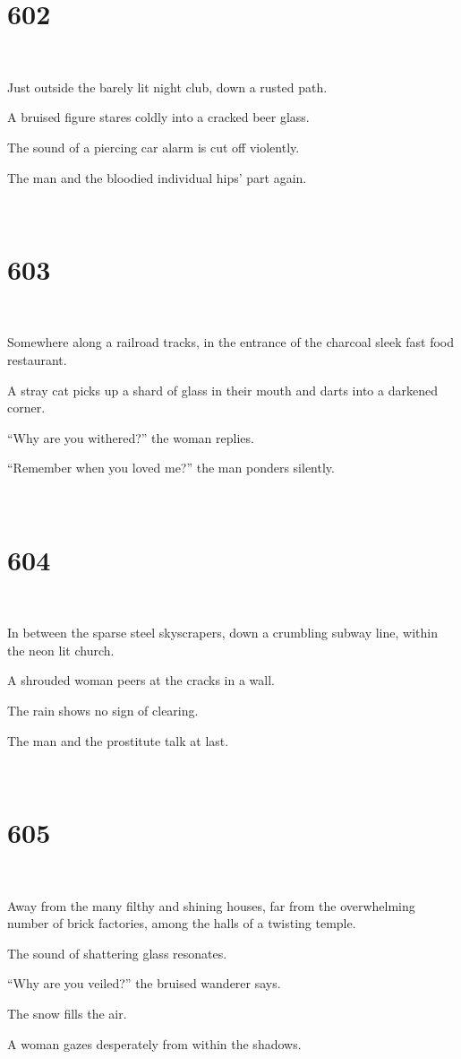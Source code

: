 \documentclass{report}
\begin{document}
\chapter*{602}
~

Just outside the barely lit night club, down a rusted path.

A bruised figure stares coldly into a cracked beer glass.

The sound of a piercing car alarm is cut off violently.

The man and the bloodied individual hips' part again.

~
\chapter*{603}
~

Somewhere along a railroad tracks, in the entrance of the charcoal sleek fast food restaurant.

A stray cat picks up a shard of glass in their mouth and darts into a darkened corner.

``Why are you withered?'' the woman replies.

``Remember when you loved me?'' the man ponders silently.

~
\chapter*{604}
~

In between the sparse steel skyscrapers, down a crumbling subway line, within the neon lit church.

A shrouded woman peers at the cracks in a wall.

The rain shows no sign of clearing.

The man and the prostitute talk at last.

~
\chapter*{605}
~

Away from the many filthy and shining houses, far from the overwhelming number of brick factories, among the halls of a twisting temple.

The sound of shattering glass resonates.

``Why are you veiled?'' the bruised wanderer says.

The snow fills the air.

A woman gazes desperately from within the shadows.
\end{document}
